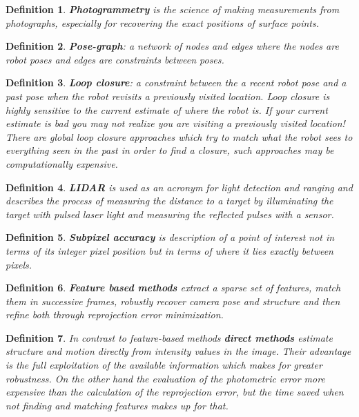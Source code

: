 \documentclass[10pt,a4paper]{scrartcl}
\newtheorem{define}{Definition}
\begin{document}
\begin{multicols*}{2}
\begin{define}
\textbf{Photogrammetry} is the science of making measurements from photographs, especially for recovering the exact positions of surface points.
\end{define}

\begin{define}
\textbf{Pose-graph}: a network of nodes and edges where the nodes are robot poses and edges are constraints between poses.
\end{define}

\begin{define}
\textbf{Loop closure}: a constraint between the a recent robot pose and a past pose when the robot revisits a previously visited location. Loop closure is highly sensitive to the current estimate of where the robot is. If your current estimate is bad you may not realize you are visiting a previously visited location! There are global loop closure approaches which try to match what the robot sees to everything seen in the past in order to find a closure, such approaches may be computationally expensive.
\end{define}

\begin{define}
\textbf{LIDAR} is used as an acronym for light detection and ranging and describes the process of measuring the distance to a target by illuminating the target with pulsed laser light and measuring the reflected pulses with a sensor.
\end{define}

\begin{define}
\textbf{Subpixel accuracy} is description of a point of interest not in terms of its integer pixel position but in terms of where it lies exactly between pixels.
\end{define}

\begin{define}
\textbf{Feature based methods} extract a sparse set of features, match them in successive frames, robustly recover camera pose and structure and then refine both through reprojection error minimization.
\end{define}

\begin{define}
In contrast to feature-based methods \textbf{direct methods} estimate structure and motion directly from intensity values in the image. Their advantage is the full exploitation of the available information which makes for greater robustness. On the other hand the evaluation of the photometric error more expensive than the calculation of the reprojection error, but the time saved when not finding and matching features makes up for that. 
\end{define}


\end{multicols*}
\end{document}
